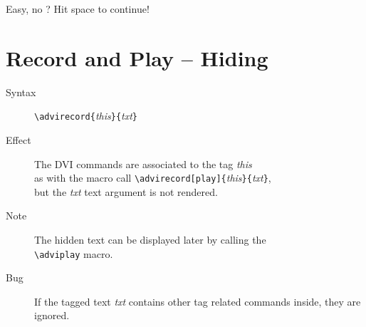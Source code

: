 \documentclass[10pt]{article}
\begin{document}
\bigskip
\noindent
Easy, no ? Hit space to continue!\advipause

\section{Record and Play -- Hiding}

\begin{description}
\item[Syntax]  \verb"\advirecord{"{\em{this}}\verb"}{"{\em{txt}}\verb"}"
\item[Effect] The DVI commands are associated to the tag {\em{this}}\\
  as with the macro call \verb"\advirecord[play]{"{\em{this}}\verb"}{"{\em{txt}}\verb"}",\\ 
  but the {\em{txt}} text argument is not rendered.
\item[Note] The hidden text can be displayed later by calling the\\
  \verb"\adviplay" macro.
\item[Bug] If the tagged text {\em{txt}} contains other tag related
  commands inside, they are ignored.
\end{description}
\end{document}
